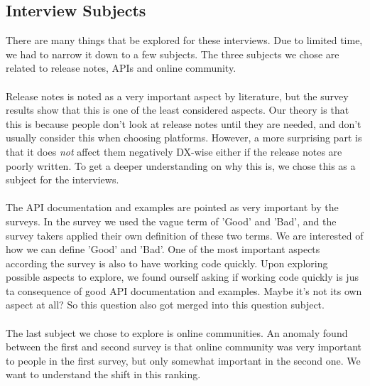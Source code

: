 \documentclass{cslthse-msc}
\begin{document}
    \subsection{Interview Subjects}
    There are many things that be explored for these interviews. Due to limited
    time, we had to narrow it down to a few subjects. The three subjects
    we chose are related to release notes, APIs and online community.
    \\ \\
    Release notes is noted as a very important aspect by literature, but
    the survey results show that this is one of the least considered aspects.
    Our theory is that this is because people don't look
    at release notes until they are needed, and don't usually consider this
    when choosing platforms. However, a more surprising part is that it does \textit{not}
    affect them negatively DX-wise either if the release notes are poorly written.
    To get a deeper understanding on why this is, we chose this as a subject
    for the interviews.
    \\ \\
    The API documentation and examples are pointed as very important by the
    surveys. In the survey we used the vague term of 'Good' and 'Bad', and
    the survey takers applied their own definition of these two terms. We
    are interested of how we can define 'Good' and 'Bad'. One of the most important
    aspects according the survey is also to have working code quickly. Upon exploring
    possible aspects to explore, we found ourself asking if working code quickly
    is jus ta consequence of good API documentation and examples. Maybe it's not
    its own aspect at all? So this question also got merged into this question subject.
    \\ \\
    The last subject we chose to explore is online communities. An anomaly found
    between the first and second survey is that online community was very important
    to people in the first survey, but only somewhat important in the second one.
    We want to understand the shift in this ranking.
\end{document}
